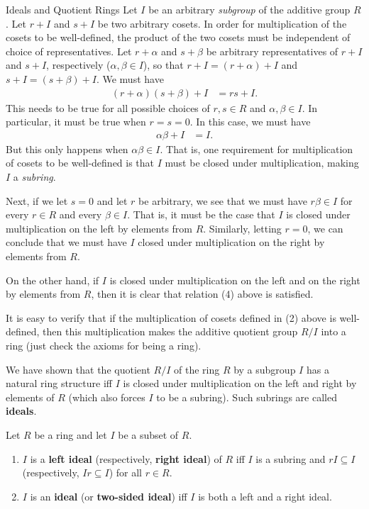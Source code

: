 \begin{section}{Ideals and Quotient Rings}
Let $I$ be an arbitrary \emph{subgroup} of the additive group $R$.  Let $r+I$ and $s+I$ be two arbitrary cosets.  In order for multiplication of the cosets to be well-defined, the product of the two cosets must be independent of choice of representatives.  Let $r+\alpha$ and $s+\beta$ be arbitrary representatives of $r+I$ and $s+I$, respectively ($\alpha,\beta\in I$), so that $r+I=(r+\alpha)+I$ and $s+I=(s+\beta)+I$.  We must have
\begin{align}
(r+\alpha)(s+\beta)+I & =rs+I.
\end{align}
This needs to be true for all possible choices of $r,s\in R$ and $\alpha, \beta\in I$.  In particular, it must be true when $r=s=0$.  In this case, we must have
\begin{align}
\alpha\beta+I & =I.
\end{align}
But this only happens when $\alpha\beta\in I$.  That is, one requirement for multiplication of cosets to be well-defined is that $I$ must be closed under multiplication, making $I$ a \emph{subring}.

Next, if we let $s=0$ and let $r$ be arbitrary, we see that we must have $r\beta\in I$ for every $r\in R$ and every $\beta\in I$.  That is, it must be the case that $I$ is closed under multiplication on the left by elements from $R$.  Similarly, letting $r=0$, we can conclude that we must have $I$ closed under multiplication on the right by elements from $R$.  

On the other hand, if $I$ is closed under multiplication on the left and on the right by elements from $R$, then it is clear that relation (4) above is satisfied.

It is easy to verify that if the multiplication of cosets defined in (2) above is well-defined, then this multiplication makes the additive quotient group $R/I$ into a ring (just check the axioms for being a ring).

We have shown that the quotient $R/I$ of the ring $R$ by a subgroup $I$ has a natural ring structure iff $I$ is closed under multiplication on the left and right by elements of $R$ (which also forces $I$ to be a subring).  Such subrings are called \textbf{ideals}.

\begin{definition}
Let $R$ be a ring and let $I$ be a subset of $R$.
\begin{enumerate}[label=\rm{(\alph*)}]
\item $I$ is a \textbf{left ideal} (respectively, \textbf{right ideal}) of $R$ iff $I$ is a subring and $rI\subseteq I$ (respectively, $Ir\subseteq I$) for all $r\in R$.
\item $I$ is an \textbf{ideal} (or \textbf{two-sided ideal}) iff $I$ is both a left and a right ideal.
\end{enumerate}
\end{definition}


\end{section}
